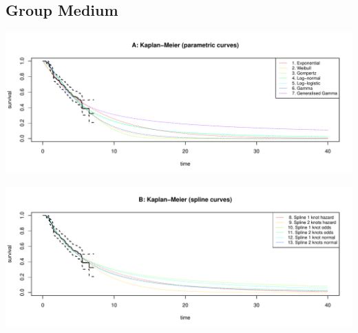 \documentclass[]{article}
\begin{document}
\newpage

\subsection{Group Medium}\label{group-medium}

\begin{flushleft}\includegraphics[height=0.29\textheight]{images/validate_extrapolation2-1} \end{flushleft}

\begin{flushleft}\includegraphics[height=0.29\textheight]{images/validate_extrapolation2-2} \end{flushleft}
\end{document}
